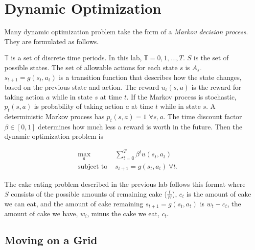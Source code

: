 
\section*{Dynamic Optimization}

Many dynamic optimization problem take the form of a \emph{Markov decision process}.
They are formulated as follows.

$\mathbb{T}$ is a set of discrete time periods.
In this lab, $\mathbb{T} = {0,1,\ldots, T}$.
$S$ is the set of possible states.
The set of allowable actions for each state $s$ is $A_s$.
$s_{t+1}=g(s_t,a_t)$ is a transition function that describes how the state changes, based on the previous state and action.
The reward $u_t(s,a)$ is the reward for taking action $a$ while in state $s$ at time $t$.
If the Markov process is stochastic, $p_t(s,a)$ is probability of taking action $a$ at time $t$ while in state $s$.
A deterministic Markov process has $p_t(s,a) = 1$ $\forall s,a$.
The time discount factor $\beta \in [0,1]$ determines how much less a reward is worth in the future.
Then the dynamic optimization problem is

\begin{align}
\label{eq:policyiter-dynopt1}
\max_a  & \sum_{t=0}^T \beta^t u(s_t,a_t) \\
\mbox{subject to } & s_{t+1}= g(s_t,a_t)\ \forall t.
\end{align}

The cake eating problem described in the previous lab follows this format where $S$ consists of the possible amounts of remaining cake ($\frac{i}{W}$), $c_t$ is the amount of cake we can eat, and the amount of cake remaining $s_{t+1}=g(s_t,a_t)$ is $w_t-c_t$, the amount of cake we have, $w_i$, minus the cake we eat, $c_t$.


\subsection*{Moving on a Grid}

